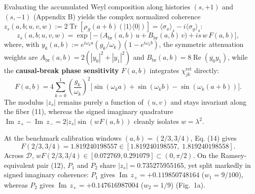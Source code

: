 \documentclass[11pt,letterpaper]{article}
\theoremstyle{definition}
\begin{document}
Evaluating the accumulated Weyl composition along histories \((s, +1)\)
and \((s, -1)\) (Appendix B) yields the complex normalized coherence
\(z_s(a, b; u, v, w) := 2\operatorname{Tr}[\rho_S(a+b)(|1\rangle\langle 0|)] = \langle \sigma_x \rangle_s - i\langle \sigma_y \rangle_s\):
\[z_s(a, b; u, v, w) = \exp\!\Big[-\big(A_{\mathrm{br}}(a, b)\, u + B_{\mathrm{br}}(a, b)\, v\big) + i s\, w\, F(a, b)\Big],
\tag{13}\] where, with
\(y_k(a,b) := e^{i\omega_k a}(g_k/\omega_k)(1 - e^{i\omega_k b})\), the
symmetric attenuation weights are
\(A_{\mathrm{br}}(a,b) = 2(|y_0|^2 + |y_1|^2)\) and
\(B_{\mathrm{br}}(a,b) = 8\operatorname{Re}(\overline{y_0}y_1)\), while
the \textbf{causal-break phase sensitivity} \(F(a, b)\) integrates
\(\chi_{jk}^{\mathrm{ret}}\) directly:
\[F(a, b) = 4 \sum_{k=0}^{1} \left(\frac{g_k}{\omega_k}\right)^2 \Big[\sin(\omega_k a) + \sin(\omega_k b) - \sin(\omega_k(a + b))\Big].
\tag{14}\] The modulus \(|z_s|\) remains purely a function of \((u, v)\)
and stays invariant along the fiber (11), whereas the signed imaginary
quadrature
\(\operatorname{Im}\,z_+ - \operatorname{Im}\,z_- = 2|z_s|\sin(w F(a, b))\)
cleanly isolates \(w = \lambda^2\).

At the benchmark calibration windows \((a, b) = (2/3, 3/4)\), Eq. (14)
gives
\[F(2/3, 3/4) = 1.819240198557 \in [1.819240198557,\; 1.819240198558].
\tag{15}\] Across \(\mathcal{D}\),
\(w F(2/3, 3/4) \in [0.072769, 0.291079] \subset (0, \pi/2)\). On the
Ramsey-equivalent pair (12), \(P_1\) and \(P_2\) share
\(|z_s| = 0.735275955165\), yet split markedly in signed imaginary
coherence: \(P_1\) gives \(\operatorname{Im}\,z_+ = +0.119850748164\)
(\(w_1 = 9/100\)), whereas \(P_2\) gives
\(\operatorname{Im}\,z_+ = +0.147616987004\) (\(w_2 = 1/9\)) (Fig.~1a).
\end{document}
